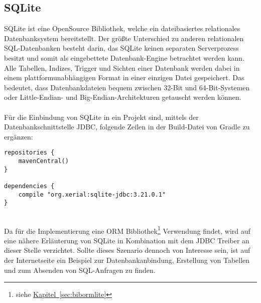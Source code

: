 \subsection{SQLite}\label{sec:bibsqlite}
SQLite ist eine OpenSource Bibliothek, welche ein dateibasiertes relationales Datenbanksystem bereitstellt. Der größte Unterschied zu anderen relationalen SQL-Datenbanken besteht darin, das SQLite keinen separaten Serverprozess besitzt und somit als eingebettete Datenbank-Engine betrachtet werden kann. Alle Tabellen, Indizes, Trigger und Sichten einer Datenbank werden dabei in einem plattformunabhängigen Format in einer einzigen Datei gespeichert. Das bedeutet, dass Datenbankdateien bequem zwischen 32-Bit und 64-Bit-Systemen oder Little-Endian- und Big-Endian-Architekturen getauscht werden können. \cite{sqliteAbout}\\
\\
Für die Einbindung von SQLite in ein Projekt sind, mittels der Datenbankschnittstelle \gls{JDBC}, folgende Zeilen in der Build-Datei von Gradle zu ergänzen:
\\
\begin{lstlisting}[style=lstStyleFramed, language=Gradle, caption={Einbindung der Bibliothek SQLite mittels Gradle}, label=lst:sqlite, float]
repositories {
	mavenCentral()
}

dependencies {
	compile "org.xerial:sqlite-jdbc:3.21.0.1"
}
\end{lstlisting}
\\
Da für die Implementierung eine \gls{ORM} Bibliothek\footnote{siehe \hyperref[sec:bibormlite]{Kapitel~\ref{sec:bibormlite}}} Verwendung findet, wird auf eine nähere Erläuterung von SQLite in Kombination mit dem \gls{JDBC} Treiber an dieser Stelle verzichtet. Sollte dieses Szenario dennoch von Interesse sein, ist auf der Internetseite \cite{sqliteJDBCTutorial} ein Beispiel zur Datenbankanbindung, Erstellung von Tabellen und zum Absenden von SQL-Anfragen zu finden.

